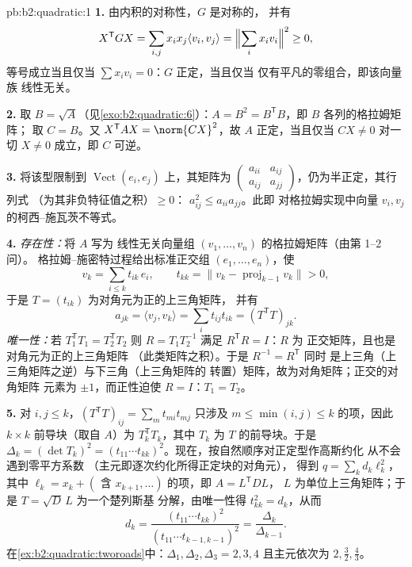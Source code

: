 \begin{solution}{pb:b2:quadratic:1}
\textbf{1.} 由内积的对称性，$G$ 是对称的，
并有
\[
X^{\mathsf T}GX = \sum_{i,j}x_ix_j\langle v_i, v_j\rangle
= \Bigl\|\sum_i x_iv_i\Bigr\|^2 \geq 0 ,
\]
等号成立当且仅当 $\sum x_iv_i = 0$：$G$ 正定，当且仅当
仅有平凡的零组合，即该向量族
线性无关。

\textbf{2.} 取 $B = \sqrt A$（见\cref{exo:b2:quadratic:6}）：$A
= B^2 = B^{\mathsf T}B$，即 $B$ 各列的格拉姆矩阵；
取 $C = B$。又 $X^{\mathsf T}AX = \norm{CX}^2$，故 $A$
正定，当且仅当 $CX \neq 0$ 对一切 $X \neq 0$ 成立，即 $C$ 可逆。

\textbf{3.} 将该型限制到
$\operatorname{Vect}(e_i, e_j)$ 上，其矩阵为
$\begin{pmatrix} a_{ii} & a_{ij}\\ a_{ij} & a_{jj}
\end{pmatrix}$，仍为半正定，其行列式
（为其非负特征值之积）$\geq 0$：
$a_{ij}^2 \leq a_{ii}a_{jj}$。此即
对格拉姆实现中向量 $v_i, v_j$ 的柯西–施瓦茨不等式。

\textbf{4.} \emph{存在性：}将 $A$ 写为
线性无关向量组 $(v_1, \dots, v_n)$ 的格拉姆矩阵（由第 1–2 问）。
格拉姆–施密特过程给出标准正交组 $(e_1, \dots, e_n)$，使
\[
v_k = \sum_{i \leq k} t_{ik}\,e_i,
\qquad t_{kk} = \bigl\| v_k - \operatorname{proj}_{k-1}v_k
\bigr\| > 0 ,
\]
于是 $T = (t_{ik})$ 为对角元为正的上三角矩阵，
并有
\[
a_{jk} = \langle v_j, v_k\rangle
= \sum_i t_{ij}t_{ik} = (T^{\mathsf T}T)_{jk} .
\]
\emph{唯一性：}若 $T_1^{\mathsf T}T_1 = T_2^{\mathsf T}T_2$
则 $R = T_1T_2^{-1}$ 满足 $R^{\mathsf T}R = I$：$R$ 为
正交矩阵，且也是对角元为正的上三角矩阵
（此类矩阵之积）。于是 $R^{-1} = R^{\mathsf T}$ 同时
是上三角（上三角矩阵之逆）与下三角（上三角矩阵的
转置）矩阵，故为对角矩阵；正交的对角矩阵
元素为 $\pm1$，而正性迫使 $R = I$：$T_1 = T_2$。

\textbf{5.} 对 $i, j \leq k$，$(T^{\mathsf T}T)_{ij} = \sum_m
t_{mi}t_{mj}$ 只涉及 $m \leq \min(i,j) \leq k$ 的项，因此
$k\times k$ 前导块（取自 $A$）为 $T_k^{\mathsf T}T_k$，其中
$T_k$ 为 $T$ 的前导块。于是 $\Delta_k = (\det T_k)^2
= (t_{11}\cdots t_{kk})^2$。现在，按自然顺序对正定型作高斯约化
从不会遇到零平方系数
（主元即逐次约化所得正定块的对角元），
得到 $q
= \sum_k d_k\ell_k^2$，其中 $\ell_k = x_k + (\text{ 含 }
x_{k+1}, \dots)$ 的项，即 $A = L^{\mathsf T}DL$，
$L$ 为单位上三角矩阵；于是 $T = \sqrt D\,L$ 为一个楚列斯基
分解，由唯一性得 $t_{kk}^2 = d_k$，从而
\[
d_k = \frac{(t_{11}\cdots t_{kk})^2}
{(t_{11}\cdots t_{k-1,k-1})^2}
= \frac{\Delta_k}{\Delta_{k-1}} .
\]
在\cref{ex:b2:quadratic:tworoads}中：$\Delta_1, \Delta_2,
\Delta_3 = 2, 3, 4$ 且主元依次为 $2, \frac32, \frac43$。


\end{solution}
